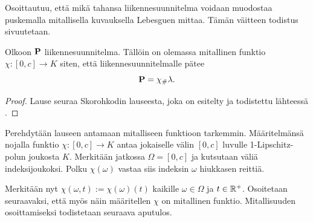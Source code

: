 \documentclass[12pt,oneside,a4paper]{amsbook} %
\begin{document}
Osoittautuu, että mikä tahansa liikennesuunnitelma voidaan muodostaa puskemalla mitallisella kuvauksella Lebesguen mittaa. Tämän väitteen todistus sivuutetaan.

\begin{theorem}\label{thm:skorohkod}
    Olkoon $\P$ liikennesuunnitelma. Tällöin on olemassa mitallinen funktio $\chi: [0, c] \to K$ siten, että liikennesuunnitelmalle pätee $$\P =\chi_\# \lambda.$$
\end{theorem}
\begin{proof}
    Lause seuraa Skorohkodin lauseesta, joka on esitelty ja todistettu lähteessä \cite[s. 185]{optimal}.
\end{proof}

Perehdytään lauseen antamaan mitalliseen funktioon tarkemmin. Määritelmänsä nojalla funktio $ \chi:[0, c] \to K$ antaa jokaiselle välin $[0, c]$ luvulle 1-Lipschitz-polun joukosta $K$. Merkitään jatkossa $\Omega = [0,c]$ ja kutsutaan väliä indeksijoukoksi. Polku $ \chi(\omega)$ vastaa siis indeksin $\omega$ hiukkasen reittiä.

Merkitään nyt $\chi(\omega, t) :=  \chi(\omega)(t)$ kaikille $\omega \in \Omega$ ja $t \in \R^+$. Osoitetaan seuraavaksi, että myös näin määritellen $\chi$ on mitallinen funktio. Mitallisuuden osoittamiseksi todistetaan seuraava aputulos.
\end{document}
